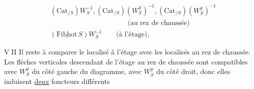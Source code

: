 \[
\begin{aligned}
&(\mathrm{Cat}_{/S})W_S^{-1},(\mathrm{Cat}_{/S})(W_S^d)^{-1},(\mathrm{Cat}_{/S})(W_S^g)^{-1}\\
&\hspace{11em}\text{(au rez de chaussée)}\\
&(\underline{\mathrm{Fibhot}}\,S)W_S^{-1}\qquad\text{(à l'étage),}
\end{aligned}
\]

\textcircled{VII}  Il reste à comparer le localisé à l'étage avec les localisés  au rez de chaussée. Les flèches verticales  descendant de l'étage au rez de chaussée sont compatibles avec $W_S^d$ du côté gauche du diagramme, avec $W_S^g$ du côté droit, donc elles induisent  \uline{deux} foncteurs différents
